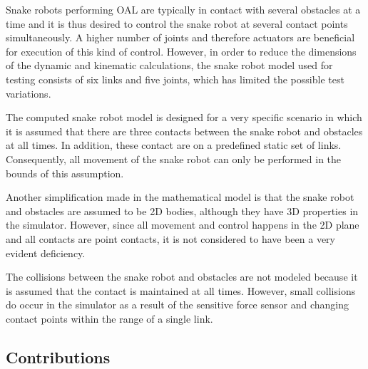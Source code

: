 Snake robots performing OAL are typically in contact with several obstacles at a time and it is thus desired to control the snake robot at several contact points simultaneously. A higher number of joints and therefore actuators are beneficial for execution of this kind of control. However, in order to reduce the dimensions of the dynamic and kinematic calculations, the snake robot model used for testing consists of six links and five joints, which has limited the possible test variations.

The computed snake robot model is designed for a very specific scenario in which it is assumed that there are three contacts between the snake robot and obstacles at all times. In addition, these contact are on a predefined static set of links. Consequently, all movement of the snake robot can only be performed in the bounds of this assumption. 

Another simplification made in the mathematical model is that the snake robot and obstacles are assumed to be 2D bodies, although they have 3D properties in the simulator. However, since all movement and control happens in the 2D plane and all contacts are point contacts, it is not considered to have been a very evident deficiency.

The collisions between the snake robot and obstacles are not modeled because it is assumed that the contact is maintained at all times. However, small collisions do occur in the simulator as a result of the sensitive force sensor and changing contact points within the range of a single link.

\subsection{Contributions}

